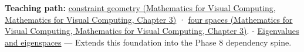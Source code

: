 \textbf{Teaching path:} \href{../02-Mathematics-for-Visual-Computing/main.pdf\#nameddest=01-foundations-i-ch019-a-linear-equation-is-a-measurement-and-several-equations-are-geometry}{constraint geometry (Mathematics for Visual Computing, Mathematics for Visual Computing, Chapter 3)} · \href{../02-Mathematics-for-Visual-Computing/main.pdf\#nameddest=01-foundations-i-ch019-rank-separates-what-the-measurements-determine-from-what-they-leave-free}{four spaces (Mathematics for Visual Computing, Mathematics for Visual Computing, Chapter 3)}. - \hyperref[appendix-0b3be18411f9]{Eigenvalues and eigenspaces} --- Extends this foundation into the Phase 8 dependency spine.

